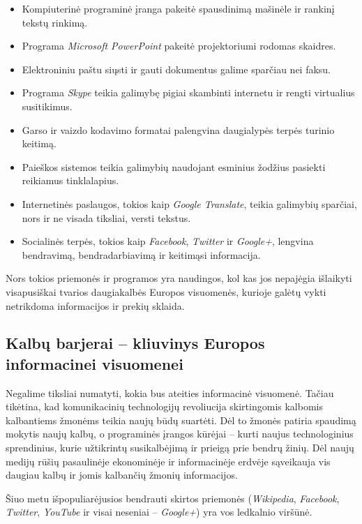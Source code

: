 \begin{multicols}{2}
\begin{itemize}
\item Kompiuterinė programinė įranga pakeitė spausdinimą mašinėle ir rankinį tekstų rinkimą.
\item Programa \textit{ Microsoft PowerPoint} pakeitė projektoriumi rodomas skaidres.
\item Elektroniniu paštu siųsti ir gauti dokumentus galime sparčiau nei faksu.
\item Programa \textit{Skype} teikia galimybę pigiai skambinti internetu ir rengti virtualius susitikimus.
\item Garso ir vaizdo kodavimo formatai palengvina daugialypės terpės turinio keitimą.
\item Paieškos sistemos teikia galimybių naudojant esminius žodžius pasiekti reikiamus tinklalapius.
\item Internetinės paslaugos, tokios kaip \textit{Google Translate}, teikia galimybių sparčiai, nors ir ne visada tiksliai, versti tekstus.
\item Socialinės terpės, tokios kaip \textit{Facebook}, \textit{Twitter} ir \textit{Google+}, lengvina bendravimą, bendradarbiavimą ir keitimąsi informacija.
\end{itemize}

Nors tokios priemonės ir programos yra naudingos, kol kas jos nepajėgia išlaikyti visapusiškai tvarios daugiakalbės Europos visuomenės, kurioje galėtų vykti netrikdoma informacijos ir prekių sklaida.

\subsection{Kalbų barjerai – kliuvinys Europos informacinei visuomenei}
  
 Negalime tiksliai numatyti, kokia bus ateities informacinė visuomenė. Tačiau tikėtina, kad komunikacinių technologijų revoliucija skirtingomis kalbomis kalbantiems žmonėms teikia naujų būdų suartėti. Dėl to žmonės patiria spaudimą mokytis naujų kalbų, o programinės įrangos kūrėjai – kurti naujus technologinius sprendinius, kurie užtikrintų susikalbėjimą ir prieigą prie bendrų žinių. Dėl naujų medijų rūšių pasaulinėje ekonominėje ir informacinėje erdvėje sąveikauja vis daugiau kalbų ir jomis kalbančių žmonių informacijos. 


Šiuo metu išpopuliarėjusios bendrauti skirtos priemonės (\textit{Wikipedia}, \textit{Facebook}, \textit{Twitter}, \textit{YouTube} ir visai neseniai – \textit{Google+}) yra vos ledkalnio viršūnė.


\end{multicols}
